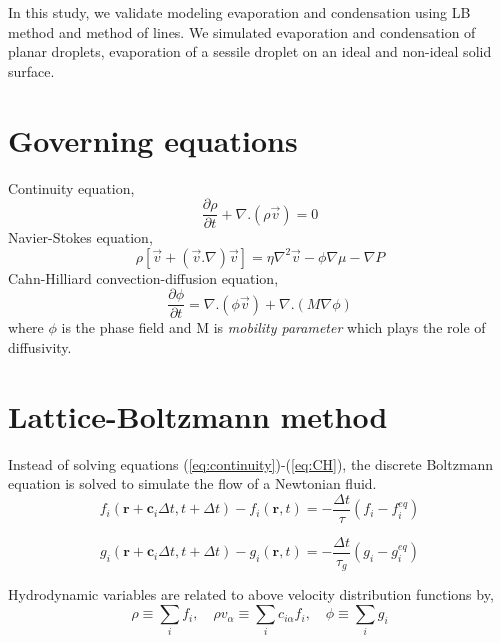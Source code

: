 \documentclass[11pt]{article}
\begin{document}
\par 
In this study, we validate modeling evaporation and condensation using LB method and method of lines. We simulated evaporation and condensation of planar droplets, evaporation of a sessile droplet on an ideal and non-ideal solid surface. 

\section{Governing equations}
Continuity equation,
\begin{equation}
	\frac{\partial \rho}{\partial t} + \nabla.(\rho \vec{v}) = 0
\label{eq:continuity}
\end{equation}
Navier-Stokes equation,
\begin{equation}
	\rho [\vec{v} + (\vec{v}.\nabla)\vec{v}] = \eta \nabla^2\vec{v}-\phi\nabla\mu - \nabla P
	\label{eq:NS}
\end{equation}
Cahn-Hilliard convection-diffusion equation,
\begin{equation}
	\frac{\partial \phi}{\partial t} = \nabla.(\phi \vec{v}) + \nabla.(M\nabla\phi)
 \label{eq:CH}
\end{equation}
where $\phi$ is the phase field and M is \textit{mobility parameter} which plays the role of diffusivity.

\section{Lattice-Boltzmann method}
Instead of solving equations (\ref{eq:continuity})-(\ref{eq:CH}), the discrete Boltzmann equation is solved to simulate the flow of a Newtonian fluid.
\begin{equation}
	f_{i}(\textbf{r}+\textbf{c}_{i}\Delta t, t+\Delta t) - f_{i}(\textbf{r},t) = -\frac{\Delta t}{\tau}(f_{i}-f_{i}^{eq})
	\label{eq:f}
\end{equation}

\begin{equation}
g_{i}(\textbf{r}+\textbf{c}_{i}\Delta t, t+\Delta t) - g_{i}(\textbf{r},t) = -\frac{\Delta t}{\tau_{g}}(g_{i}-g_{i}^{eq})
\label{eq:g}
\end{equation}

Hydrodynamic variables are related to above velocity distribution functions by,
\begin{equation}
	\rho \equiv \sum_{i} f_{i}, \quad \rho v_{\alpha} \equiv \sum_{i} c_{i\alpha} f_{i}, \quad \phi \equiv \sum_{i} g_{i}
	\label{eq:fg}
\end{equation}
\end{document}
